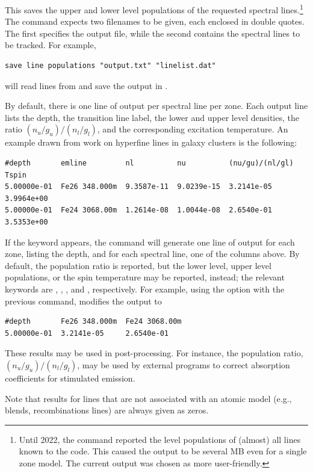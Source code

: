 This saves the upper and lower level populations of the requested spectral
lines.\footnote{
Until 2022, the command reported the level populations of (almost) all lines
known to the code.
This caused the output to be several MB even for a single zone model.
The current output was chosen as more user-friendly.
}
The command expects two filenames to be given, each enclosed in double quotes.
The first specifies the output file, while the second contains the spectral
lines to be tracked.
For example,
%
\begin{verbatim}
save line populations "output.txt" "linelist.dat"
\end{verbatim}
%
will read lines from  and save the output in
.

By default, there is one line of output per spectral line per zone.
Each output line lists the depth, the transition line label,
the lower and upper level densities, the ratio $(n_u/g_u)/(n_l/g_l)$,
and the corresponding excitation temperature.
An example drawn from work on hyperfine lines in galaxy clusters is the
following:
%
\begin{verbatim}
#depth       emline         nl          nu          (nu/gu)/(nl/gl)  Tspin
5.00000e-01  Fe26 348.000m  9.3587e-11  9.0239e-15  3.2141e-05       3.9964e+00
5.00000e-01  Fe24 3068.00m  1.2614e-08  1.0044e-08  2.6540e-01       3.5353e+00
\end{verbatim}

If the  keyword appears, the command will generate one line of
output for each zone, listing the depth, and for each spectral line, one of the
columns above.
By default, the population ratio is reported, but the lower level, upper level
populations, or the spin temperature may be reported, instead; the relevant
keywords are , , , and
, respectively.
For example, using the  option with the previous command,
modifies the output to
%
\begin{verbatim}
#depth       Fe26 348.000m  Fe24 3068.00m
5.00000e-01  3.2141e-05     2.6540e-01
\end{verbatim}

These results may be used in post-processing.
For instance, the population ratio, $(n_u/g_u)/(n_l/g_l)$, may be used by
external programs to correct absorption coefficients for stimulated emission.

Note that results for lines that are not associated with an atomic model (e.g.,
blends, recombinations lines) are always given as zeros.

